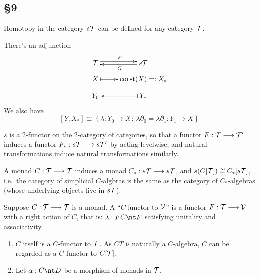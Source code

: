 \documentclass[11pt]{article}
\begin{document}
\begin{Operads}
\subsection*{\S 9}

\begin{itemise}
\item Homotopy in the category $s\mathcal{T}$ can be defined for any category $\mathcal{T}$.
\item There's an adjunction
\[\xymatrix@R=.3cm{
\calT  \ar@<.6ex>[r]^{F}&
s\calT  \ar@<.4ex>[l]^{G}\\
X \ar@{|->}[r] & \textup{const}(X)=:X_*\\
Y_0             & Y_* \ar@{|->}[l]\\
}\]
We also have
\[[Y,X_*]\cong\left\{\lambda:Y_0\to X\,:\,
\lambda\partial_0=\lambda\partial_1:Y_1\to X\right\}\]
\item $s$ is a 2-functor on the 2-category of categories, so that a functor $F:\mathcal{T}\longrightarrow\mathcal{T}'$ induces a functor $F_*:s\mathcal{T}\longrightarrow s\mathcal{T}'$ by acting levelwise, and natural transformations induce natural transformations similarly.
\item A monad $C:\mathcal{T}\longrightarrow\mathcal{T}$ induces a monad $C_*:s\mathcal{T}\longrightarrow s\mathcal{T}$, and $s(C[\mathcal{T}])\cong C_*[s\mathcal{T}]$, i.e.\ the category of simplicial $C$-algbras is the same as the category of $C_*$-algebras (whose underlying objects live in $s\mathcal{T}$).
\item Suppose $C:\mathcal{T}\longrightarrow\mathcal{T}$ is a monad. A ``$C$-functor to $\mathcal{V}$'' is a functor $F:\mathcal{T}\longrightarrow \mathcal{V}$ with a right action of $C$, that is: $\lambda:FC\nt F$ satisfying unitality and associativity.
\begin{exmps*}
\begin{enumerate}\squishlist
\item $C$ itself is a $C$-functor to $\mathcal{T}$. As $CT$ is naturally a $C$-algebra, $C$ can be regarded as a $C$-functor to $C[\mathcal{T}]$.
\item Let $\alpha:C\nt D$ be a morphism of monads in $\mathcal{T}$.
\end{enumerate}

\end{exmps*}

\end{itemise}
\end{Operads}
\end{document}
